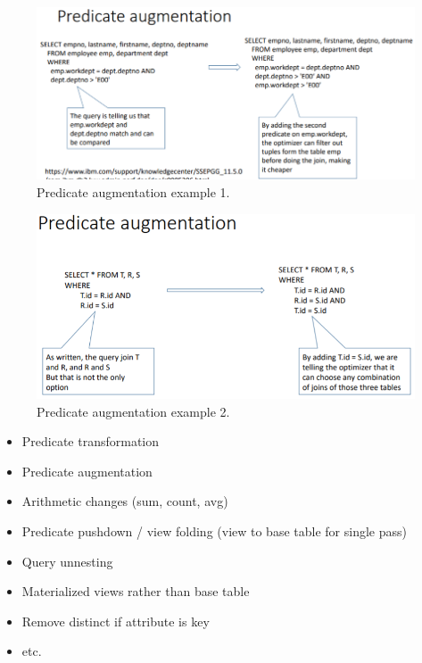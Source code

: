 \begin{figure}[h]
	\centering
	\includegraphics[scale=0.5]{images/3-aug1.PNG}
	\caption{Predicate augmentation example 1.}
	\label{fig:aug1}
\end{figure}

\begin{figure}[h]
	\centering
	\includegraphics[scale=0.5]{images/3-aug2.PNG}
	\caption{Predicate augmentation example 2.}
	\label{fig:aug2}
\end{figure}


\begin{itemize}
    \item Predicate transformation
    \item Predicate augmentation
    \item Arithmetic changes (sum, count, avg)
    \item Predicate pushdown / view folding (view to base table for single pass)
    \item Query unnesting
    \item Materialized views rather than base table %
    \item Remove distinct if attribute is key
    \item etc. %
\end{itemize}


